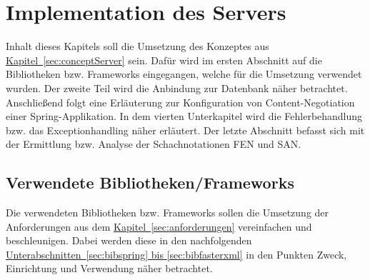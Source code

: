 
\chapter{Implementation des Servers}
Inhalt dieses Kapitels soll die Umsetzung des Konzeptes aus \hyperref[sec:conceptServer]{Kapitel~\ref{sec:conceptServer}} sein. Dafür wird im ersten Abschnitt auf die Bibliotheken bzw. Frameworks eingegangen, welche für die Umsetzung verwendet wurden. Der zweite Teil wird die Anbindung zur Datenbank näher betrachtet. Anschließend folgt eine Erläuterung zur Konfiguration von Content-Negotiation einer Spring-Applikation. In dem vierten Unterkapitel wird die Fehlerbehandlung bzw. das Exceptionhandling näher erläutert. Der letzte Abschnitt befasst sich mit der Ermittlung bzw. Analyse der Schachnotationen \gls{FEN} und \gls{SAN}.

\section{Verwendete Bibliotheken/Frameworks}
Die verwendeten Bibliotheken bzw. Frameworks sollen die Umsetzung der Anforderungen aus dem \hyperref[sec:anforderungen]{Kapitel~\ref{sec:anforderungen}} vereinfachen und beschleunigen. Dabei werden diese in den nachfolgenden \hyperref[sec:bibspring, sec:bibfasterxml]{Unterabschnitten~\ref{sec:bibspring} bis \ref{sec:bibfasterxml}} in den Punkten Zweck, Einrichtung und Verwendung näher betrachtet. 

